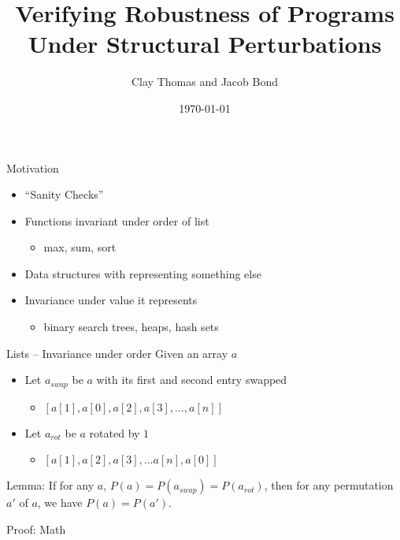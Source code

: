 \documentclass[usenames,dvipsnames]{beamer}
\title{Verifying Robustness of Programs Under Structural Perturbations}
\author{Clay Thomas and Jacob Bond}
\date{\today}
\begin{document}

\begin{frame}
  \titlepage
\end{frame}

\begin{frame}[fragile]{Motivation}
  \begin{itemize}
    \item ``Sanity Checks''
    \vfill
    \item Functions invariant under order of list
    \begin{itemize}
      \item max, sum, sort
    \end{itemize}
    \vfill
    \item Data structures with representing something else
    \item Invariance under value it represents
    \begin{itemize}
      \item binary search trees, heaps, hash sets
    \end{itemize}
  \end{itemize}
\end{frame}

\begin{frame}[fragile]{Lists -- Invariance under order}
  Given an array $a$
  \begin{itemize}
    \item Let $a_{swap}$ be $a$ with its first and second entry swapped
    \begin{itemize}
      \item $[ a[1], a[0], a[2], a[3], \ldots, a[n] ]$
    \end{itemize}
    \item Let $a_{rot}$ be $a$ rotated by $1$
    \begin{itemize}
      \item $[ a[1], a[2], a[3], \ldots  a[n], a[0] ]$
    \end{itemize}
  \end{itemize}
  \vfill
  Lemma: If for any $a$, $P(a) = P(a_{swap}) = P(a_{rot})$,
  then for any permutation $a'$ of $a$,
  we have $P(a) = P(a')$.

  Proof: Math
\end{frame}
\end{document}
